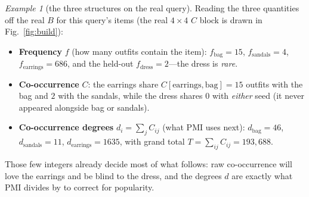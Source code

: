 \documentclass[11pt]{article}
\theoremstyle{remark}
\newtheorem{example}{Example}
\begin{document}
\begin{example}[the three structures on the real query]\label{ex:derived}
Reading the three quantities off the real $B$ for this query's items (the real $4\times4$ $C$ block is drawn in
Fig.~\ref{fig:build}):
\begin{itemize}\itemsep1pt
\item \textbf{Frequency} $f$ (how many outfits contain the item): $f_{\text{bag}}=15$, $f_{\text{sandals}}=4$,
$f_{\text{earrings}}=686$, and the held-out $f_{\text{dress}}=2$---the dress is \emph{rare}.
\item \textbf{Co-occurrence} $C$: the earrings share $C[\text{earrings},\text{bag}]=15$ outfits with the bag and $2$
with the sandals, while the dress shares $0$ with \emph{either} seed (it never appeared alongside bag or sandals).
\item \textbf{Co-occurrence degrees} $d_i=\sum_j C_{ij}$ (what PMI uses next): $d_{\text{bag}}=46$,
$d_{\text{sandals}}=11$, $d_{\text{earrings}}=1635$, with grand total $T=\sum_{ij}C_{ij}=193{,}688$.
\end{itemize}
Those few integers already decide most of what follows: raw co-occurrence will love the earrings and be blind to the
dress, and the degrees $d$ are exactly what PMI divides by to correct for popularity.
\end{example}
\end{document}
